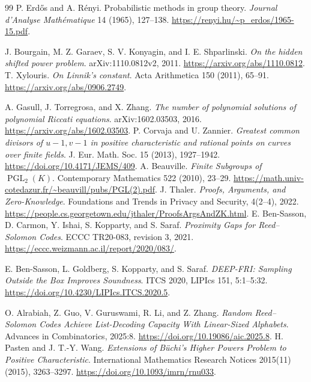 \documentclass[11pt,letterpaper]{article}
\theoremstyle{definition}
\theoremstyle{remark}
\begin{document}
\begin{thebibliography}{99}
 P. Erd\H{o}s and A. R\'enyi.
Probabilistic methods in group theory.
\emph{Journal d'Analyse Math\'ematique} 14 (1965), 127--138.
\url{https://renyi.hu/~p_erdos/1965-15.pdf}.

 J. Bourgain, M. Z. Garaev, S. V. Konyagin,
and I. E. Shparlinski. \emph{On the hidden shifted power problem}.
arXiv:1110.0812v2, 2011. \url{https://arxiv.org/abs/1110.0812}.
 T. Xylouris. \emph{On Linnik's constant}.
Acta Arithmetica 150 (2011), 65--91.
\url{https://arxiv.org/abs/0906.2749}.

 A. Gasull, J. Torregrosa, and X. Zhang.
\emph{The number of polynomial solutions of polynomial Riccati equations}.
arXiv:1602.03503, 2016. \url{https://arxiv.org/abs/1602.03503}.
 P. Corvaja and U. Zannier.
\emph{Greatest common divisors of $u-1,v-1$ in positive characteristic
and rational points on curves over finite fields}.
J. Eur. Math. Soc. 15 (2013), 1927--1942.
\url{https://doi.org/10.4171/JEMS/409}.
 A. Beauville.
\emph{Finite Subgroups of $\operatorname{PGL}_2(K)$}.
Contemporary Mathematics 522 (2010), 23--29.
\url{https://math.univ-cotedazur.fr/~beauvill/pubs/PGL(2).pdf}.
 J. Thaler.
\emph{Proofs, Arguments, and Zero-Knowledge}.
Foundations and Trends in Privacy and Security, 4(2--4), 2022.
\url{https://people.cs.georgetown.edu/jthaler/ProofsArgsAndZK.html}.
 E. Ben-Sasson, D. Carmon, Y. Ishai, S. Kopparty,
and S. Saraf. \emph{Proximity Gaps for Reed--Solomon Codes}.
ECCC TR20-083, revision 3, 2021.
\url{https://eccc.weizmann.ac.il/report/2020/083/}.

 E. Ben-Sasson, L. Goldberg, S. Kopparty, and S. Saraf.
\emph{DEEP-FRI: Sampling Outside the Box Improves Soundness}.
ITCS 2020, LIPIcs 151, 5:1--5:32.
\url{https://doi.org/10.4230/LIPIcs.ITCS.2020.5}.

 O. Alrabiah, Z. Guo, V. Guruswami, R. Li, and Z. Zhang.
\emph{Random Reed--Solomon Codes Achieve List-Decoding Capacity With
Linear-Sized Alphabets}. Advances in Combinatorics, 2025:8.
\url{https://doi.org/10.19086/aic.2025.8}.
 H. Pasten and J. T.-Y. Wang.
\emph{Extensions of B\"uchi's Higher Powers Problem to Positive Characteristic}.
International Mathematics Research Notices 2015(11) (2015), 3263--3297.
\url{https://doi.org/10.1093/imrn/rnu033}.


\end{thebibliography}
\end{document}
